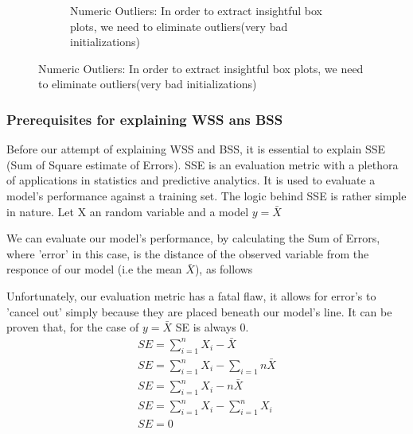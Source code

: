 \documentclass[11pt]{article}
\begin{document}
\begin{figure}[H]
\begin{subfigure}{0.4\textwidth}
					\caption{Numeric Outliers: In order to extract insightful box plots, we need to eliminate outliers(very bad initializations)}
					\label{fig:first}
				\end{subfigure}
					\label{fig:figures}
			\end{figure}
			\fi
			
			\subsubsection*{Prerequisites for explaining WSS ans BSS}
				Before our attempt of explaining WSS and BSS, it is essential to explain SSE (Sum of Square estimate of Errors). SSE is an evaluation metric with a plethora of applications in statistics and predictive analytics\cite{???}. It is used to evaluate a model's performance against a training set\cite{???}. The logic behind SSE is rather simple in nature. Let X an random variable and a model $y=\bar{X}$

				We can evaluate our model's performance, by calculating the Sum of Errors, where 'error' in this case, is the distance of the observed variable from the responce of our model (i.e the mean $\bar{X}$), as follows

				Unfortunately, our evaluation metric has a fatal flaw, it allows for error's to 'cancel out' simply because they are placed beneath our model's line. It can be proven that, for the case of $y=\bar{X}$ SE is always 0.
				\iffalse
				\begin{align}
					SE = \sum_{i=1}^{n}{X_i-\bar{X}} \\
					SE = \sum_{i=1}^{n}{X_i} - \sum_{i=1}{n}{\bar{X}} \\
					SE = \sum_{i=1}^{n}{X_i} - n\bar{X} \\
					SE = \sum_{i=1}^{n}{X_i} - \sum_{i=1}^{n}{X_i} \\
					SE = 0 \\
				\end{align}
\end{document}
